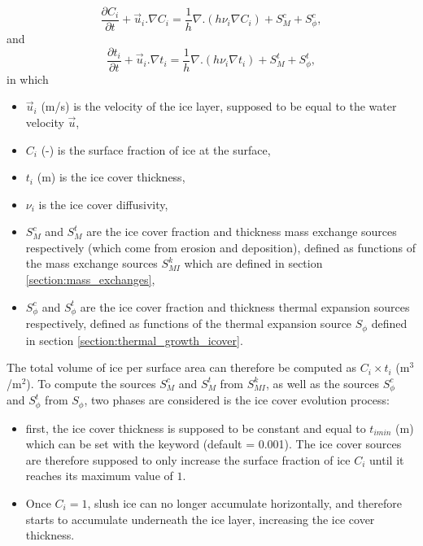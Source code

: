 \begin{equation}
  \frac{\partial C_i}{\partial t} + \vec{u}_i . \nabla C_i = \dfrac{1}{h} \nabla . \left( h \nu_i  \nabla C_i \right) +  S_{M}^c + S_{\phi}^c,
\end{equation}
and
\begin{equation}
  \frac{\partial t_i}{\partial t} + \vec{u}_i . \nabla t_i = \dfrac{1}{h} \nabla . \left( h \nu_i  \nabla t_i \right) +  S_{M}^t + S_{\phi}^t,
\end{equation}
in which
\begin{itemize}
\item $\vec{u}_i$ (m/s) is the velocity of the ice layer, supposed to be equal to the water velocity $\vec{u}$,
\item $C_i$ (-) is the surface fraction of ice at the surface,
\item $t_i$ (m) is the ice cover thickness,
\item $\nu_i$ is the ice cover diffusivity,
\item $S_{M}^c$ and $S_{M}^t$ are the ice cover fraction and thickness mass exchange sources respectively (which come from erosion and deposition), defined as functions of the mass exchange sources $S_{MI}^k$ which are defined in section \ref{section:mass_exchanges},
\item $S_{\phi}^c$ and $S_{\phi}^t$ are the ice cover fraction and thickness thermal expansion sources respectively,
defined as functions of the thermal expansion source $S_{\phi}$ defined in section \ref{section:thermal_growth_icover}.
\end{itemize}

The total volume of ice per surface area can therefore be computed as $C_i \times t_i$ (m$^3$/m$^2$).
To compute the sources $S_{M}^c$ and $S_{M}^t$ from $S_{MI}^k$,
as well as the sources $S_{\phi}^c$ and $S_{\phi}^t$ from $S_{\phi}$,
two phases are considered is the ice cover evolution process:
\begin{itemize}
\item first, the ice cover thickness is supposed to be constant and equal to $t_{imin}$ (m) which can be set with the keyword  (default = 0.001). The ice cover sources are therefore supposed to only increase the surface fraction of ice $C_i$ until it reaches its maximum value of $1$.
\item Once $C_i=1$, slush ice can no longer accumulate horizontally, and therefore starts to accumulate underneath the ice layer, increasing the ice cover thickness.
\end{itemize}

